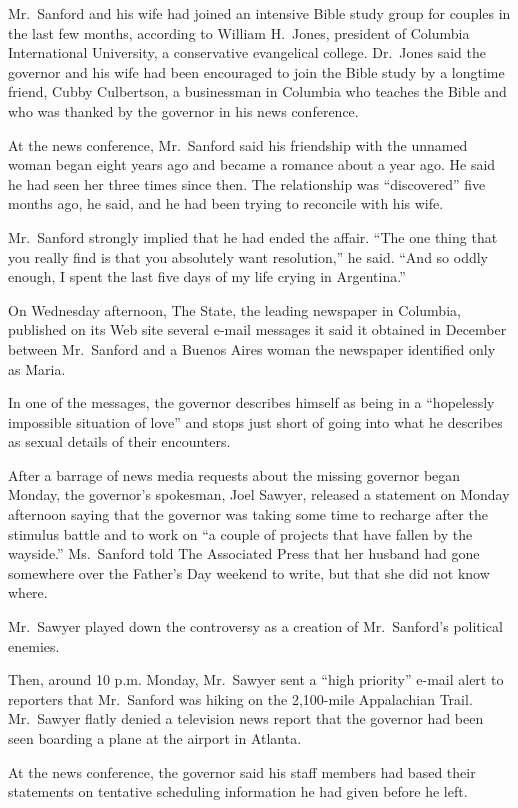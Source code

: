 ﻿\documentclass[12pt]{article}
\begin{document}
Mr.~Sanford and his wife had joined an intensive Bible study group for couples in the last few
months, according to William H.~Jones, president of Columbia International University, a
conservative evangelical college. Dr.~Jones said the governor and his wife had been encouraged to
join the Bible study by a longtime friend, Cubby Culbertson, a businessman in Columbia who teaches
the Bible and who was thanked by the governor in his news conference.

At the news conference, Mr.~Sanford said his friendship with the unnamed woman began eight years ago
and became a romance about a year ago. He said he had seen her three times since then. The
relationship was ``discovered'' five months ago, he said, and he had been trying to reconcile with
his wife.

Mr.~Sanford strongly implied that he had ended the affair. ``The one thing that you really find is
that you absolutely want resolution,'' he said. ``And so oddly enough, I spent the last five days of
my life crying in Argentina.''

On Wednesday afternoon, The State, the leading newspaper in Columbia, published on its Web site
several e-mail messages it said it obtained in December between Mr.~Sanford and a Buenos Aires woman
the newspaper identified only as Maria.

In one of the messages, the governor describes himself as being in a ``hopelessly impossible
situation of love'' and stops just short of going into what he describes as sexual details of their
encounters.

After a barrage of news media requests about the missing governor began Monday, the governor's
spokesman, Joel Sawyer, released a statement on Monday afternoon saying that the governor was taking
some time to recharge after the stimulus battle and to work on ``a couple of projects that have
fallen by the wayside.'' Ms.~Sanford told The Associated Press that her husband had gone somewhere
over the Father's Day weekend to write, but that she did not know where.

Mr.~Sawyer played down the controversy as a creation of Mr.~Sanford's political enemies.

Then, around 10 p.m. Monday, Mr.~Sawyer sent a ``high priority'' e-mail alert to reporters that
Mr.~Sanford was hiking on the 2,100-mile Appalachian Trail. Mr.~Sawyer flatly denied a television
news report that the governor had been seen boarding a plane at the airport in Atlanta.

At the news conference, the governor said his staff members had based their statements on tentative
scheduling information he had given before he left.
\end{document}
